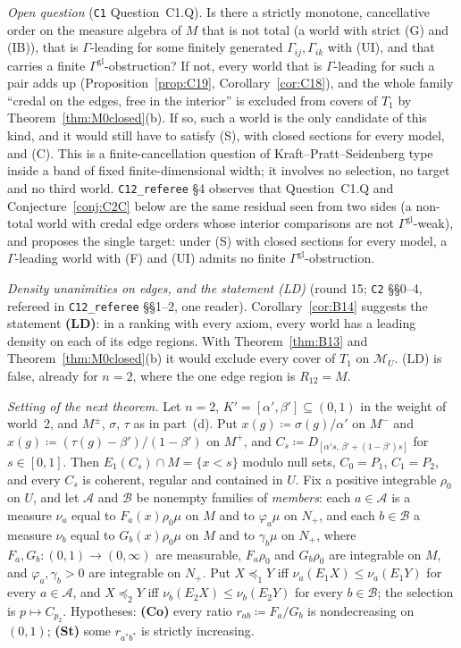 \documentclass[11pt]{article}
\theoremstyle{definition}
\theoremstyle{remark}
\newcommand{\M}{\mathcal M}
\newcommand{\src}[1]{\texttt{#1}}
\begin{document}
\emph{Open question} (\src{C1} Question~C1.Q). Is there a strictly monotone, cancellative order on the measure algebra of $M$ that is not total (a world with strict (G) and (IB)), that is $\Gamma$-leading for some finitely generated $\Gamma_{ij},\Gamma_{ik}$ with (UI), and that carries a finite $\Gamma^{\mathrm{gl}}$-obstruction? If not, every world that is $\Gamma$-leading for such a pair adds up (Proposition~\ref{prop:C19}, Corollary~\ref{cor:C18}), and the whole family ``credal on the edges, free in the interior'' is excluded from covers of $T_1$ by Theorem~\ref{thm:M0closed}(b). If so, such a world is the only candidate of this kind, and it would still have to satisfy (S), with closed sections for every model, and (C). This is a finite-cancellation question of Kraft--Pratt--Seidenberg type inside a band of fixed finite-dimensional width; it involves no selection, no target and no third world. \src{C12\_referee} \S4 observes that Question~C1.Q and Conjecture~\ref{conj:C2C} below are the same residual seen from two sides (a non-total world with credal edge orders whose interior comparisons are not $\Gamma^{\mathrm{gl}}$-weak), and proposes the single target: under (S) with closed sections for every model, a $\Gamma$-leading world with (F) and (UI) admits no finite $\Gamma^{\mathrm{gl}}$-obstruction.

\emph{Density unanimities on edges, and the statement (LD)} (round 15; \src{C2} \S\S0--4, refereed in \src{C12\_referee} \S\S1--2, one reader). Corollary~\ref{cor:B14} suggests the statement \textbf{(LD)}: in a ranking with every axiom, every world has a leading density on each of its edge regions. With Theorem~\ref{thm:B13} and Theorem~\ref{thm:M0closed}(b) it would exclude every cover of $T_1$ on $\M_U$. (LD) is false, already for $n=2$, where the one edge region is $R_{12}=M$.

\emph{Setting of the next theorem.} Let $n=2$, $K'=[\alpha',\beta']\subseteq(0,1)$ in the weight of world~2, and $M^\pm$, $\sigma$, $\tau$ as in part~(d). Put $x(g)\coloneqq\sigma(g)/\alpha'$ on $M^-$ and $x(g)\coloneqq(\tau(g)-\beta')/(1-\beta')$ on $M^+$, and $C_s\coloneqq D_{[\alpha's,\,\beta'+(1-\beta')s]}$ for $s\in[0,1]$. Then $E_1(C_s)\cap M=\{x<s\}$ modulo null sets, $C_0=P_1$, $C_1=P_2$, and every $C_s$ is coherent, regular and contained in $U$. Fix a positive integrable $\rho_0$ on $U$, and let $\mathcal A$ and $\mathcal B$ be nonempty families of \emph{members}: each $a\in\mathcal A$ is a measure $\nu_a$ equal to $F_a(x)\rho_0\mu$ on $M$ and to $\varphi_a\mu$ on $N_+$, and each $b\in\mathcal B$ a measure $\nu_b$ equal to $G_b(x)\rho_0\mu$ on $M$ and to $\gamma_b\mu$ on $N_+$, where $F_a,G_b:(0,1)\to(0,\infty)$ are measurable, $F_a\rho_0$ and $G_b\rho_0$ are integrable on $M$, and $\varphi_a,\gamma_b>0$ are integrable on $N_+$. Put $X\preceq_1Y$ iff $\nu_a(E_1X)\le\nu_a(E_1Y)$ for every $a\in\mathcal A$, and $X\preceq_2Y$ iff $\nu_b(E_2X)\le\nu_b(E_2Y)$ for every $b\in\mathcal B$; the selection is $p\mapsto C_{p_2}$. Hypotheses: \textbf{(Co)} every ratio $r_{ab}\coloneqq F_a/G_b$ is nondecreasing on $(0,1)$; \textbf{(St)} some $r_{a^*b^*}$ is strictly increasing.
\end{document}

